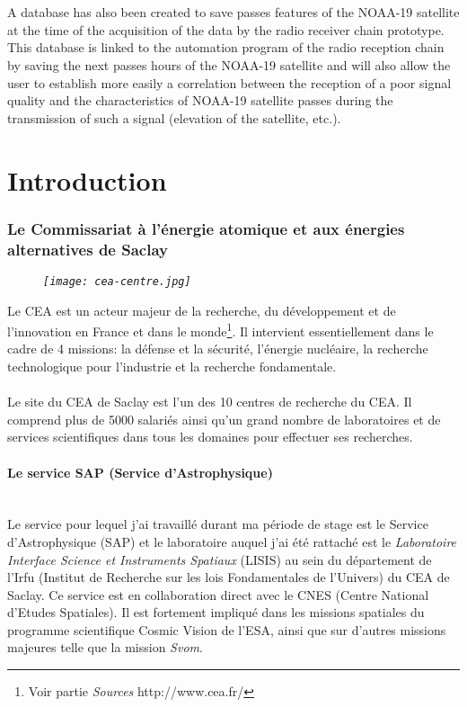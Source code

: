 \documentclass[12pt,fleqn]{book} %
\begin{document}
~ \\\\A database has also been created to save passes features of the NOAA-19 satellite at the time of the acquisition of the data by the radio receiver chain prototype. This database is linked to the automation program of the radio reception chain by saving the next passes hours of the NOAA-19 satellite and will also allow the user to establish more easily a correlation between the reception of a poor signal quality and the characteristics of NOAA-19 satellite passes during the transmission of such a signal (elevation of the satellite, etc.).




\pagestyle{empty} %

\tableofcontents %

\part{Introduction}
\setcounter{chapter}{1}
\section{Le Commissariat à l'énergie atomique et aux énergies alternatives de Saclay}
\begin{figure}[H]
	\centering
	\itshape
	\texttt{[image: cea-centre.jpg]}
\end{figure}
\indent Le CEA est un acteur majeur de la recherche, du développement et de l'innovation en France et dans le monde\footnote{Voir partie \emph{Sources} http://www.cea.fr/}. Il intervient essentiellement dans le cadre de 4 missions: la défense et la sécurité, l'énergie nucléaire, la recherche technologique pour l'industrie et la recherche fondamentale.
~\\\\Le site du CEA de Saclay est l'un des 10 centres de recherche du CEA. Il comprend plus de 5000 salariés ainsi qu'un grand nombre de laboratoires et de services scientifiques dans tous les domaines pour effectuer ses recherches. 
\subsection{Le service SAP (Service d'Astrophysique)}
~\\\indent Le service pour lequel j'ai travaillé durant ma période de stage est le Service d'Astrophysique (SAP) et le laboratoire auquel j'ai été rattaché est le \emph{Laboratoire Interface Science et Instruments Spatiaux} (LISIS) au sein du département de l'Irfu (Institut de Recherche sur les lois Fondamentales de l'Univers) du CEA de Saclay. Ce service est en collaboration direct avec le CNES (Centre National d'Etudes Spatiales). Il est fortement impliqué dans les missions spatiales du programme scientifique Cosmic Vision de l’ESA, ainsi que sur d'autres missions majeures telle que la mission \emph{Svom}. 
\end{document}
